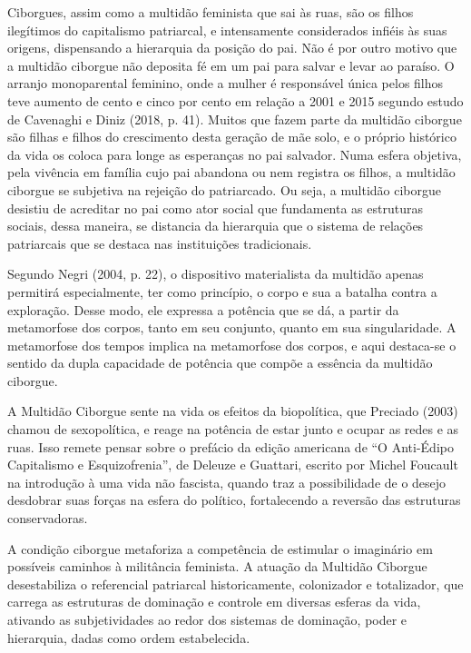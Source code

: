 Ciborgues, assim como a multidão feminista que sai às ruas, são os
filhos ilegítimos do capitalismo patriarcal, e intensamente considerados
infiéis às suas origens, dispensando a hierarquia da posição do pai. Não
é por outro motivo que a multidão ciborgue não deposita fé em um pai
para salvar e levar ao paraíso. O arranjo monoparental feminino, onde a
mulher é responsável única pelos filhos teve aumento de cento e cinco
por cento em relação a 2001 e 2015 segundo estudo de Cavenaghi e Diniz
(2018, p. 41). Muitos que fazem parte da multidão ciborgue são filhas e
filhos do crescimento desta geração de mãe solo, e o próprio histórico
da vida os coloca para longe as esperanças no pai salvador. Numa esfera
objetiva, pela vivência em família cujo pai abandona ou nem registra os
filhos, a multidão ciborgue se subjetiva na rejeição do patriarcado. Ou
seja, a multidão ciborgue desistiu de acreditar no pai como ator social
que fundamenta as estruturas sociais, dessa maneira, se distancia da
hierarquia que o sistema de relações patriarcais que se destaca nas
instituições tradicionais.

Segundo Negri (2004, p. 22), o dispositivo materialista da multidão
apenas permitirá especialmente, ter como princípio, o corpo e sua a
batalha contra a exploração. Desse modo, ele expressa a potência que se
dá, a partir da metamorfose dos corpos, tanto em seu conjunto, quanto em
sua singularidade. A metamorfose dos tempos implica na metamorfose dos
corpos, e aqui destaca-se o sentido da dupla capacidade de potência que
compõe a essência da multidão ciborgue.

A Multidão Ciborgue sente na vida os efeitos da biopolítica, que
Preciado (2003) chamou de sexopolítica, e reage na potência de estar
junto e ocupar as redes e as ruas. Isso remete pensar sobre o prefácio
da edição americana de ``O Anti-Édipo Capitalismo e Esquizofrenia'', de
Deleuze e Guattari, escrito por Michel Foucault na introdução à uma vida
não fascista, quando traz a possibilidade de o desejo desdobrar suas
forças na esfera do político, fortalecendo a reversão das estruturas
conservadoras.

A condição ciborgue metaforiza a competência de estimular o imaginário
em possíveis caminhos à militância feminista. A atuação da Multidão
Ciborgue desestabiliza o referencial patriarcal historicamente,
colonizador e totalizador, que carrega as estruturas de dominação e
controle em diversas esferas da vida, ativando as subjetividades ao
redor dos sistemas de dominação, poder e hierarquia, dadas como ordem
estabelecida.

